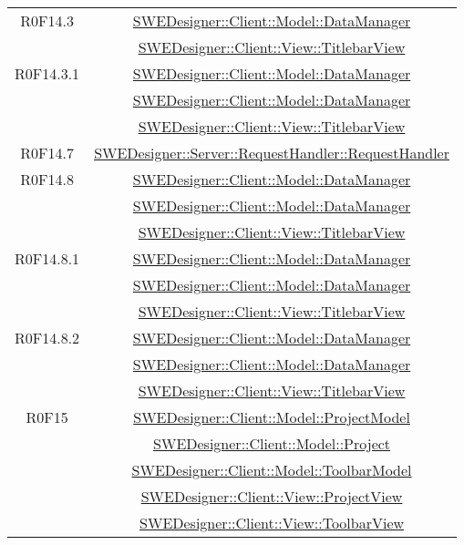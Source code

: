 \documentclass[../DefinizioneDiProdotto.tex]{subfiles}
\begin{document}
\begin{longtable}{|c|c|}
				R0F14.3
				& \hyperlink{SWEDesigner::Client::Model::DataManager}{SWEDesigner::Client::Model::DataManager}\\
				& \hyperlink{SWEDesigner::Client::View::TitlebarView}{SWEDesigner::Client::View::TitlebarView}\\
				\hline

				R0F14.3.1
				& \hyperlink{SWEDesigner::Client::Model::DataManager}{SWEDesigner::Client::Model::DataManager}\\
				& \hyperlink{SWEDesigner::Client::Model::DataManager}{SWEDesigner::Client::Model::DataManager}\\
				& \hyperlink{SWEDesigner::Client::View::TitlebarView}{SWEDesigner::Client::View::TitlebarView}\\
				\hline

				R0F14.7
				& \hyperlink{SWEDesigner::Server::RequestHandler::RequestHandler}{SWEDesigner::Server::RequestHandler::RequestHandler}\\
				\hline

				R0F14.8
				& \hyperlink{SWEDesigner::Client::Model::DataManager}{SWEDesigner::Client::Model::DataManager}\\
				& \hyperlink{SWEDesigner::Client::Model::DataManager}{SWEDesigner::Client::Model::DataManager}\\
				& \hyperlink{SWEDesigner::Client::View::TitlebarView}{SWEDesigner::Client::View::TitlebarView}\\
				\hline

				R0F14.8.1
				& \hyperlink{SWEDesigner::Client::Model::DataManager}{SWEDesigner::Client::Model::DataManager}\\
				& \hyperlink{SWEDesigner::Client::Model::DataManager}{SWEDesigner::Client::Model::DataManager}\\
				& \hyperlink{SWEDesigner::Client::View::TitlebarView}{SWEDesigner::Client::View::TitlebarView}\\
				\hline

				R0F14.8.2
				& \hyperlink{SWEDesigner::Client::Model::DataManager}{SWEDesigner::Client::Model::DataManager}\\
				& \hyperlink{SWEDesigner::Client::Model::DataManager}{SWEDesigner::Client::Model::DataManager}\\
				& \hyperlink{SWEDesigner::Client::View::TitlebarView}{SWEDesigner::Client::View::TitlebarView}\\
				\hline

				R0F15
				& \hyperlink{SWEDesigner::Client::Model::ProjectModel}{SWEDesigner::Client::Model::ProjectModel}\\
				& \hyperlink{SWEDesigner::Client::Model::Project}{SWEDesigner::Client::Model::Project}\\
				& \hyperlink{SWEDesigner::Client::Model::ToolbarModel}{SWEDesigner::Client::Model::ToolbarModel}\\
				& \hyperlink{SWEDesigner::Client::View::ProjectView}{SWEDesigner::Client::View::ProjectView}\\
				& \hyperlink{SWEDesigner::Client::View::ToolbarView}{SWEDesigner::Client::View::ToolbarView}\\
				\hline


\end{longtable}
\end{document}

